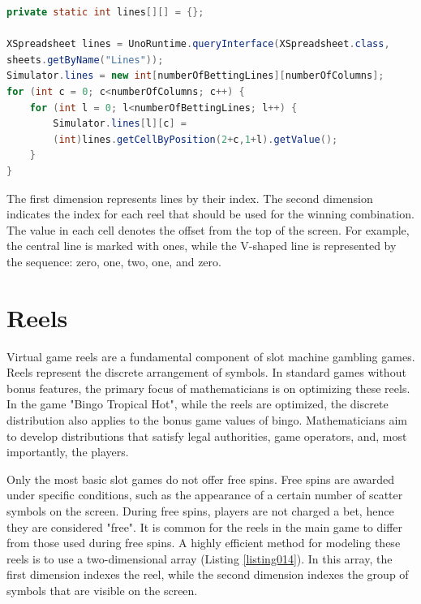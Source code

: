 \documentclass[12pt,twoside,openany]{book}
\begin{document}
\begin{lstlisting}[language=Java, caption={Pay lines array model}, label=listing013]
private static int lines[][] = {};

XSpreadsheet lines = UnoRuntime.queryInterface(XSpreadsheet.class,
sheets.getByName("Lines"));
Simulator.lines = new int[numberOfBettingLines][numberOfColumns];
for (int c = 0; c<numberOfColumns; c++) {
	for (int l = 0; l<numberOfBettingLines; l++) {
		Simulator.lines[l][c] =
		(int)lines.getCellByPosition(2+c,1+l).getValue();
	}
}
\end{lstlisting}

The first dimension represents lines by their index. The second dimension indicates the index for each reel that should be used for the winning combination. The value in each cell denotes the offset from the top of the screen. For example, the central line is marked with ones, while the V-shaped line is represented by the sequence: zero, one, two, one, and zero.

\section*{Reels}

Virtual game reels are a fundamental component of slot machine gambling games. Reels represent the discrete arrangement of symbols. In standard games without bonus features, the primary focus of mathematicians is on optimizing these reels. In the game "Bingo Tropical Hot", while the reels are optimized, the discrete distribution also applies to the bonus game values of bingo. Mathematicians aim to develop distributions that satisfy legal authorities, game operators, and, most importantly, the players.

Only the most basic slot games do not offer free spins. Free spins are awarded under specific conditions, such as the appearance of a certain number of scatter symbols on the screen. During free spins, players are not charged a bet, hence they are considered "free". It is common for the reels in the main game to differ from those used during free spins. A highly efficient method for modeling these reels is to use a two-dimensional array (Listing \ref{listing014}). In this array, the first dimension indexes the reel, while the second dimension indexes the group of symbols that are visible on the screen.
\end{document}

